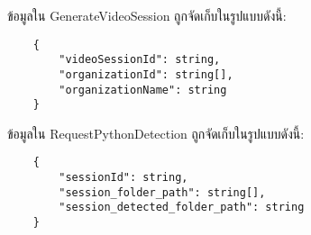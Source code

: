 ข้อมูลใน GenerateVideoSession ถูกจัดเก็บในรูปแบบดังนี้:
\begin{lstlisting}
    {
        "videoSessionId": string,
        "organizationId": string[],
        "organizationName": string
    }
\end{lstlisting}

ข้อมูลใน RequestPythonDetection ถูกจัดเก็บในรูปแบบดังนี้:
\begin{lstlisting}
    {
        "sessionId": string,
        "session_folder_path": string[],
        "session_detected_folder_path": string
    }
\end{lstlisting}
\fi